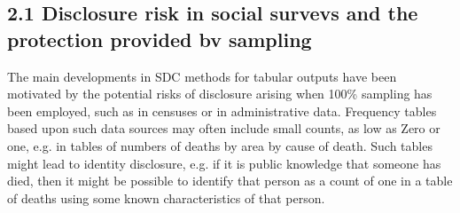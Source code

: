 \subsection*{2.1 Disclosure risk in social survevs and the protection provided bv sampling}
The main developments in SDC methods for tabular outputs have been motivated by
the potential risks of disclosure arising when 100\% sampling has been employed, such as
in censuses or in administrative data. Frequency tables based upon such data sources
may often include small counts, as low as Zero or one, e.g. in tables of numbers of deaths
by area by cause of death. Such tables might lead to identity disclosure, e.g. if it is public
knowledge that someone has died, then it might be possible to identify that person as a
count of one in a table of deaths using some known characteristics of that person.

